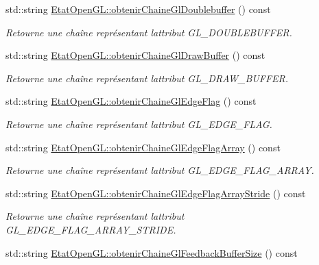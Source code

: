 \begin{DoxyCompactItemize}
std\+::string \hyperlink{group__utilitaire_gae8239c45bba646389f06a6bdd49670f3}{Etat\+Open\+G\+L\+::obtenir\+Chaine\+Gl\+Doublebuffer} () const 
\begin{DoxyCompactList}\small\item\em Retourne une chaîne représentant l\textquotesingle{}attribut G\+L\+\_\+\+D\+O\+U\+B\+L\+E\+B\+U\+F\+F\+E\+R. \end{DoxyCompactList}\item 
std\+::string \hyperlink{group__utilitaire_ga3b705291c7da107645656d5dfb51872a}{Etat\+Open\+G\+L\+::obtenir\+Chaine\+Gl\+Draw\+Buffer} () const 
\begin{DoxyCompactList}\small\item\em Retourne une chaîne représentant l\textquotesingle{}attribut G\+L\+\_\+\+D\+R\+A\+W\+\_\+\+B\+U\+F\+F\+E\+R. \end{DoxyCompactList}\item 
std\+::string \hyperlink{group__utilitaire_ga982e0dacd18861db40bc153b8e7748d6}{Etat\+Open\+G\+L\+::obtenir\+Chaine\+Gl\+Edge\+Flag} () const 
\begin{DoxyCompactList}\small\item\em Retourne une chaîne représentant l\textquotesingle{}attribut G\+L\+\_\+\+E\+D\+G\+E\+\_\+\+F\+L\+A\+G. \end{DoxyCompactList}\item 
std\+::string \hyperlink{group__utilitaire_gac69166db434f3671eb241b00786be34b}{Etat\+Open\+G\+L\+::obtenir\+Chaine\+Gl\+Edge\+Flag\+Array} () const 
\begin{DoxyCompactList}\small\item\em Retourne une chaîne représentant l\textquotesingle{}attribut G\+L\+\_\+\+E\+D\+G\+E\+\_\+\+F\+L\+A\+G\+\_\+\+A\+R\+R\+A\+Y. \end{DoxyCompactList}\item 
std\+::string \hyperlink{group__utilitaire_ga12932637a943b952d6c822af48b4102a}{Etat\+Open\+G\+L\+::obtenir\+Chaine\+Gl\+Edge\+Flag\+Array\+Stride} () const 
\begin{DoxyCompactList}\small\item\em Retourne une chaîne représentant l\textquotesingle{}attribut G\+L\+\_\+\+E\+D\+G\+E\+\_\+\+F\+L\+A\+G\+\_\+\+A\+R\+R\+A\+Y\+\_\+\+S\+T\+R\+I\+D\+E. \end{DoxyCompactList}\item 
std\+::string \hyperlink{group__utilitaire_gab0ae8d230f1fe733862032e082cfbd2f}{Etat\+Open\+G\+L\+::obtenir\+Chaine\+Gl\+Feedback\+Buffer\+Size} () const 

\end{DoxyCompactItemize}
